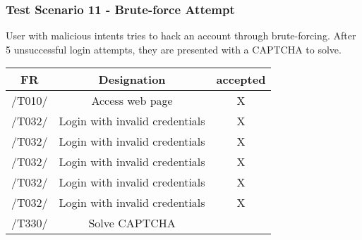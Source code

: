 \subsubsection{Test Scenario 11 -  Brute-force Attempt}
User with malicious intents tries to hack an account through brute-forcing. After 5
unsuccessful login attempts, they are presented with a CAPTCHA to solve.
\begin{table}[h]
\begin{tabular}{!{\VRule}c!{\VRule}c!{\VRule}c!{\VRule}}
\hline
FR     & Designation                                                                    &accepted                \\
\hline
  /T010/ &  Access web page &   X  \\
 \hline
 /T032/  &  Login with invalid credentials &   X  \\
 \hline
 /T032/  &  Login with invalid credentials &   X  \\
 \hline
 /T032/  &  Login with invalid credentials &   X \\
 \hline
 /T032/  &  Login with invalid credentials &   X \\
 \hline
 /T032/  &  Login with invalid credentials &   X \\
 \hline
 /T330/  &  Solve CAPTCHA &     \\
 \hline
  
\end{tabular}
\end{table}
\clearpage
